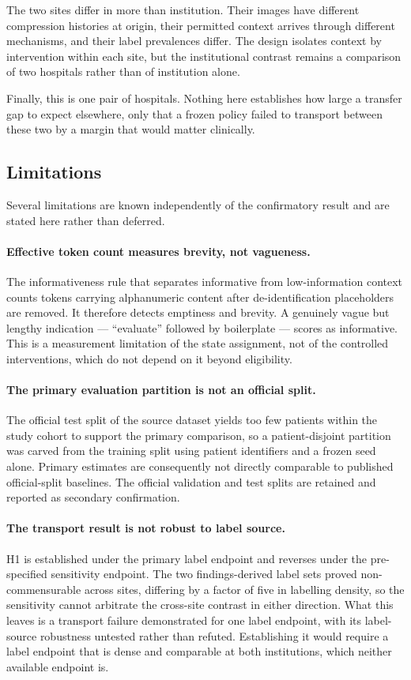 The two sites differ in more than institution. Their images have different
compression histories at origin, their permitted context arrives through
different mechanisms, and their label prevalences differ. The design isolates
context by intervention within each site, but the institutional contrast remains
a comparison of two hospitals rather than of institution alone.

Finally, this is one pair of hospitals. Nothing here establishes how large a
transfer gap to expect elsewhere, only that a frozen policy failed to transport
between these two by a margin that would matter clinically.

\subsection{Limitations}
\label{sec:limitations}


Several limitations are known independently of the confirmatory result and are
stated here rather than deferred.

\paragraph{Effective token count measures brevity, not vagueness.}
The informativeness rule that separates informative from low-information context
counts tokens carrying alphanumeric content after de-identification placeholders
are removed. It therefore detects emptiness and brevity. A genuinely vague but
lengthy indication --- ``evaluate'' followed by boilerplate --- scores as
informative. This is a measurement limitation of the state assignment, not of
the controlled interventions, which do not depend on it beyond eligibility.

\paragraph{The primary evaluation partition is not an official split.}
The official test split of the source dataset yields too few patients within the
study cohort to support the primary comparison, so a patient-disjoint partition
was carved from the training split using patient identifiers and a frozen seed
alone. Primary estimates are consequently not directly comparable to published
official-split baselines. The official validation and test splits are retained
and reported as secondary confirmation.

\paragraph{The transport result is not robust to label source.}
H1 is established under the primary label endpoint and reverses under the
pre-specified sensitivity endpoint. The two findings-derived label sets proved
non-commensurable across sites, differing by a factor of five in labelling
density, so the sensitivity cannot arbitrate the cross-site contrast in either
direction. What this leaves is a transport failure demonstrated for one label
endpoint, with its label-source robustness untested rather than refuted.
Establishing it would require a label endpoint that is dense and comparable at
both institutions, which neither available endpoint is.

